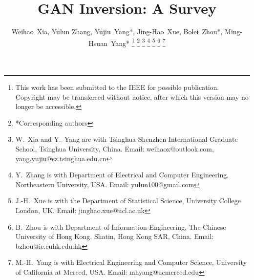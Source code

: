 \title{GAN Inversion: A Survey}


\author{Weihao~Xia,
Yulun Zhang,
Yujiu~Yang*, %
Jing-Hao~Xue, %
Bolei~Zhou*,
Ming-Hsuan~Yang*%
\thanks{This work has been submitted to the IEEE for possible publication. Copyright may be transferred without notice, after which this version may no longer be accessible.}
\thanks{*Corresponding authors}
\thanks{W.~Xia and Y.~Yang are with Tsinghua Shenzhen International Graduate School, Tsinghua University, China.
Email: weihaox@outlook.com, yang.yujiu@sz.tsinghua.edu.cn}
\thanks{Y.~Zhang is with Department of Electrical and Computer Engineering, Northeastern University, USA.
Email: yulun100@gmail.com}
\thanks{J.-H.~Xue is with the Department of Statistical Science, University College London, UK.
Email: jinghao.xue@ucl.ac.uk}
\thanks{B.~Zhou is with Department of Information Engineering, The Chinese University of Hong Kong, Shatin, Hong Kong SAR, China.
Email: bzhou@ie.cuhk.edu.hk}
\thanks{M.-H.~Yang is with Electrical Engineering and Computer Science, University of California at Merced, USA.
Email: mhyang@ucmerced.edu}
}